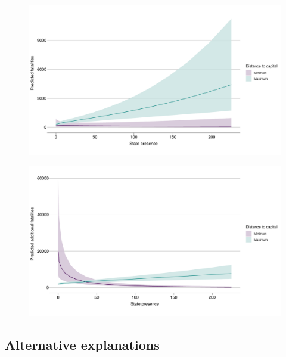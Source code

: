\begin{figure}[htpb] \centering
	\includegraphics[width=\linewidth]{"../R/Output/deathsInterPlot.pdf"}
	\caption{}
	\label{interdeaths}
\end{figure}

\begin{figure}[htpb]
	\centering
	\includegraphics[width=\linewidth]{"../R/Output/interdeathszinbplot.pdf"}
	\caption{}
	\label{deaths_zinb}
\end{figure}



\subsection{Alternative explanations} \label{Alternative explanations}

